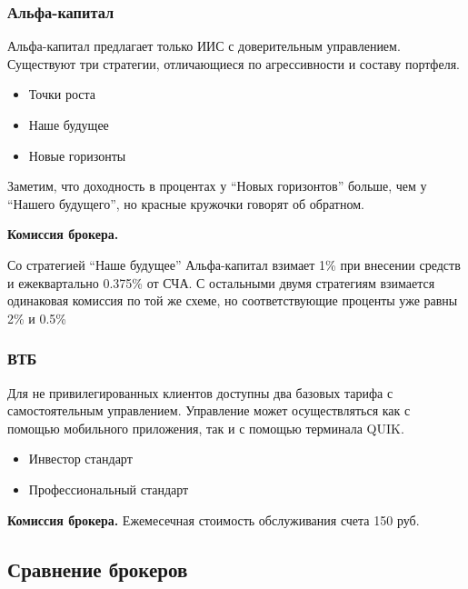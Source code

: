 \subsubsection{Альфа-капитал}

Альфа-капитал предлагает только ИИС с доверительным управлением. Существуют три стратегии, отличающиеся по агрессивности и составу портфеля.

\begin{itemize}
    \item Точки роста
    \item Наше будущее
    \item Новые горизонты
\end{itemize}


Заметим, что доходность в процентах  у ``Новых горизонтов'' больше, чем у ``Нашего будущего'', но красные кружочки говорят об обратном.

\textbf{Комиссия брокера.}

Со стратегией ``Наше будущее'' Альфа-капитал взимает 1\% при внесении средств и ежеквартально 0.375\% от СЧА. С остальными двумя стратегиям взимается одинаковая комиссия по той же схеме, но соответствующие проценты уже равны 2\% и 0.5\%

\newpage

\subsubsection{ВТБ}
Для не привилегированных клиентов доступны два базовых тарифа с самостоятельным управлением. Управление может осуществляться как с помощью мобильного приложения, так и с помощью терминала QUIK.

\begin{itemize}
    \item Инвестор стандарт
    \item Профессиональный стандарт
\end{itemize}

\textbf{Комиссия брокера.}
Ежемесечная стоимость обслуживания счета 150 руб.

\newpage
\subsection{Сравнение брокеров}

